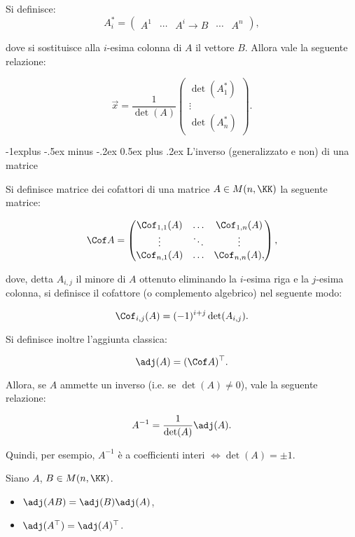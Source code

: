 \documentclass[10pt,landscape]{article}
\makeatletter
\renewcommand{\subsection}{\@startsection{subsection}{2}{0mm}%
	{-1explus -.5ex minus -.2ex}%
	{0.5ex plus .2ex}%
	{\normalfont\normalsize\bfseries}}
\makeatother
\begin{document}
\begin{multicols}{3}
		Si definisce:
		\[ A_i^* = \begin{pmatrix}
			A^1 & \cdots & A^i \to B & \cdots & A^n
		\end{pmatrix}, \]
		
		dove si sostituisce alla $i$-esima colonna di $A$ il vettore $B$. Allora
		vale la seguente relazione:
		
		\[ \vec{x} = \frac{1}{\det(A)} \begin{pmatrix}
			\det(A_1^*) \\ \vdots \\ \det(A_n^*)
		\end{pmatrix}. \]
		
		\subsection{L'inverso (generalizzato e non) di una matrice}
		
		Si definisce matrice dei cofattori di una matrice $A \in M(n, \KK)$ la
		seguente matrice:
		
		\[ \Cof A = \begin{pmatrix}
			\Cof_{1,1}(A) & \ldots & \Cof_{1,n}(A) \\
			\vdots & \ddots & \vdots \\ 
			\Cof_{n,1}(A) & \ldots & \Cof_{n,n}(A),
		\end{pmatrix}, \]
		
		dove, detta $A_{i,j}$ il minore di $A$ ottenuto eliminando
		la $i$-esima riga e la $j$-esima colonna, si definisce il cofattore (o
		complemento algebrico) nel seguente modo:
		
		\[ \Cof_{i,j}(A) = (-1)^{i+j} \det( A_{i, j}). \]
		
		Si definisce inoltre l'aggiunta classica:
		
		\[ \adj(A) = (\Cof A)^\top. \]
		
		Allora, se $A$ ammette un inverso (i.e. se $\det(A) \neq 0$),
		vale la seguente relazione:
		
		\[ A^{-1} = \frac{1}{\det(A)} \adj(A). \]
		
		\vskip 0.05in
		
		Quindi, per esempio, $A^{-1}$ è a coefficienti
		interi $\iff \det(A) = \pm 1$.
		
		Siano $A$, $B \in M(n, \KK)$.
		
		\begin{itemize}
			\item $\adj(AB) = \adj(B)\adj(A)$,
			\item $\adj(A^\top) = \adj(A)^\top$.
		\end{itemize}
		

\end{multicols}
\end{document}
